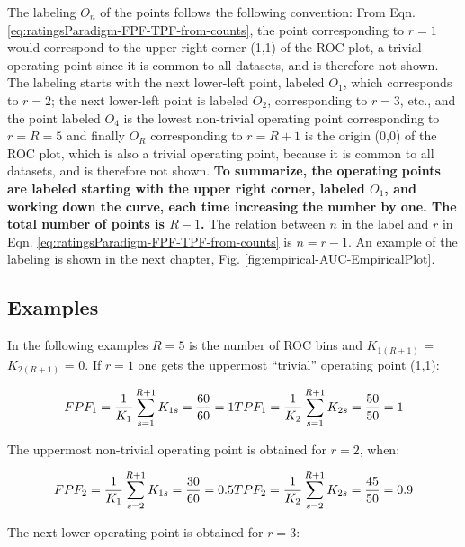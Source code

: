 \documentclass[
]{book}
\begin{document}
The labeling \(O_n\) of the points follows the following convention: From Eqn. \eqref{eq:ratingsParadigm-FPF-TPF-from-counts}, the point corresponding to \(r=1\) would correspond to the upper right corner (1,1) of the ROC plot, a trivial operating point since it is common to all datasets, and is therefore not shown. The labeling starts with the next lower-left point, labeled \(O_1\), which corresponds to \(r=2\); the next lower-left point is labeled \(O_2\), corresponding to \(r=3\), etc., and the point labeled \(O_4\) is the lowest non-trivial operating point corresponding to \(r=R=5\) and finally \(O_R\) corresponding to \(r=R+1\) is the origin (0,0) of the ROC plot, which is also a trivial operating point, because it is common to all datasets, and is therefore not shown. \textbf{To summarize, the operating points are labeled starting with the upper right corner, labeled \(O_1\), and working down the curve, each time increasing the number by one. The total number of points is \(R-1\).} The relation between \(n\) in the label and \(r\) in Eqn. \eqref{eq:ratingsParadigm-FPF-TPF-from-counts} is \(n=r-1\). An example of the labeling is shown in the next chapter, Fig. \ref{fig:empirical-AUC-EmpiricalPlot}.

\hypertarget{examples}{%
\subsection{Examples}\label{examples}}

In the following examples \(R = 5\) is the number of ROC bins and \(K_{1(R+1)}\) = \(K_{2(R+1)}\) = 0. If \(r = 1\) one gets the uppermost ``trivial'' operating point (1,1):

\begin{equation*} 
FPF_1=\frac {1} {K_1} \sum_{s=1}^{R+1}K_{1s} = \frac{60}{60} = 1\\
TPF_1=\frac {1} {K_2} \sum_{s=1}^{R+1}K_{2s} = \frac{50}{50} = 1
\end{equation*}

The uppermost non-trivial operating point is obtained for \(r = 2\), when:

\begin{equation*} 
FPF_2=\frac {1} {K_1} \sum_{s=2}^{R+1}K_{1s} = \frac{30}{60} = 0.5\\
TPF_2=\frac {1} {K_2} \sum_{s=2}^{R+1}K_{2s} = \frac{45}{50} = 0.9
\end{equation*}

The next lower operating point is obtained for \(r = 3\):
\end{document}
